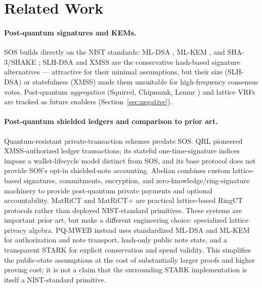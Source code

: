 \documentclass[11pt]{article}
\theoremstyle{plain}
\theoremstyle{definition}
\theoremstyle{remark}
\begin{document}
\section{Related Work}
\label{sec:related}

\paragraph{Post-quantum signatures and KEMs.} SOS builds directly on the
NIST standards: ML-DSA \cite{fips204,dilithium2018}, ML-KEM
\cite{fips203,kyber2018}, and SHA-3/SHAKE \cite{fips202}; SLH-DSA
\cite{fips205} and XMSS \cite{rfc8391} are the conservative hash-based
signature alternatives --- attractive for their minimal assumptions, but
their size (SLH-DSA) or statefulness (XMSS) made them unsuitable for
high-frequency consensus votes. Post-quantum \emph{aggregation} (Squirrel,
Chipmunk, Lemur \cite{squirrel2022,chipmunk2023,lemur2026}) and lattice
VRFs \cite{lbvrf2021} are tracked as future enablers
(Section~\ref{sec:negative}).

\paragraph{Post-quantum shielded ledgers and comparison to prior art.}
Quantum-resistant private-transaction schemes predate SOS. QRL \cite{qrl2017}
pioneered XMSS-authorized ledger transactions; its stateful one-time-signature
indices impose a wallet-lifecycle model distinct from SOS, and its base protocol
does not provide SOS's opt-in shielded-note accounting. Abelian
\cite{abelian2023} combines custom lattice-based signatures, commitments,
encryption, and zero-knowledge/ring-signature machinery to provide
post-quantum private payments and optional accountability. MatRiCT and
MatRiCT+ \cite{matrict2019,matrictplus2022} are practical lattice-based RingCT
protocols rather than deployed NIST-standard primitives. These systems are
important prior art, but make a different engineering choice: specialized
lattice privacy algebra. PQ-MWEB instead uses standardized ML-DSA and ML-KEM
for authorization and note transport, hash-only public note state, and a
transparent STARK for explicit conservation and spend validity. This simplifies
the public-state assumptions at the cost of substantially larger proofs and
higher proving cost; it is not a claim that the surrounding STARK implementation
is itself a NIST-standard primitive.
\end{document}
